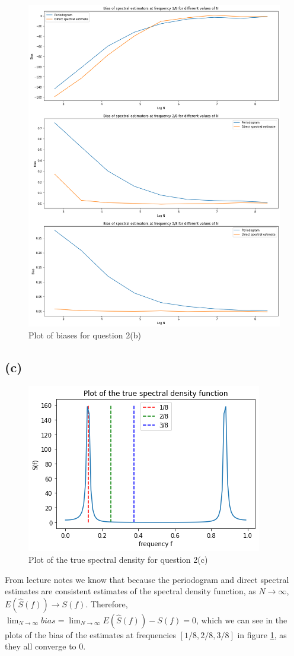 \documentclass[a4paper,10pt]{article}
\theoremstyle{mytheor}
\begin{document}
\begin{figure}[h!]
    \centering
    \includegraphics[width=0.85\columnwidth]{plot2b.png}
    \caption{Plot of biases for question 2(b)}
    \label{plot2b}
\end{figure}

\subsection*{(c)}

\begin{figure}[h!]
    \centering
    \includegraphics[width = 0.4\columnwidth]{plot2c.png}
    \caption{Plot of the true spectral density for question 2(c)}
    \label{plot2c}
\end{figure}

From lecture notes we know that because the periodogram and direct spectral estimates are consistent estimates of the spectral density function, as $N \rightarrow \infty$, $E(\hat{S}(f)) \rightarrow S(f)$. Therefore, $\lim_{N\rightarrow \infty}bias = \lim_{N\rightarrow \infty}E(\hat{S}(f)) - S(f) = 0 $, which we can see in the plots of the bias of the estimates at frequencies $[1/8, 2/8, 3/8]$ in figure \ref{plot2b}, as they all converge to 0.\\
\end{document}

